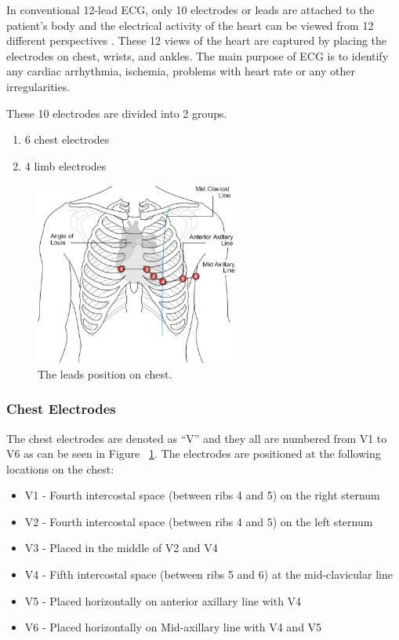 In conventional 12-lead ECG, only 10 electrodes or leads are attached to the patient's body and the electrical activity of the heart can be viewed from 12 different perspectives \cite{cablesandsensors}. These 12 views of the heart are captured by placing the electrodes on chest, wrists, and ankles. The main purpose of ECG is to identify any cardiac arrhythmia, ischemia, problems with heart rate or any other irregularities.

These 10 electrodes are divided into 2 groups. 
\begin{enumerate}
	\item 6 chest electrodes
	\item 4 limb electrodes
\end{enumerate}

\begin{figure}[htpb]
	\centering
	\includegraphics[width=\textwidth,height=6cm,keepaspectratio=true]{images/6_lead_placement}
	\caption{
		The leads position on chest\cite{TUON:six_leads}.
	}
	\label{fig:6_lead_placement}
\end{figure}


\subsubsection{Chest Electrodes}
The chest electrodes are denoted as ``V'' and they all are numbered from V1 to V6 as can be seen in Figure ~\ref{fig:6_lead_placement}. The electrodes are positioned at the following locations on the chest:

\begin{itemize}
	\item V1 - Fourth intercostal space (between ribs 4 and 5) on the right sternum
	\item V2 - Fourth intercostal space (between ribs 4 and 5) on the left sternum
	\item V3 - Placed in the middle of V2 and V4
	\item V4 - Fifth intercostal space (between ribs 5 and 6) at the mid-clavicular line
	\item V5 - Placed horizontally on anterior axillary line with V4
	\item V6 - Placed horizontally on Mid-axillary line with V4 and V5
\end{itemize} 


